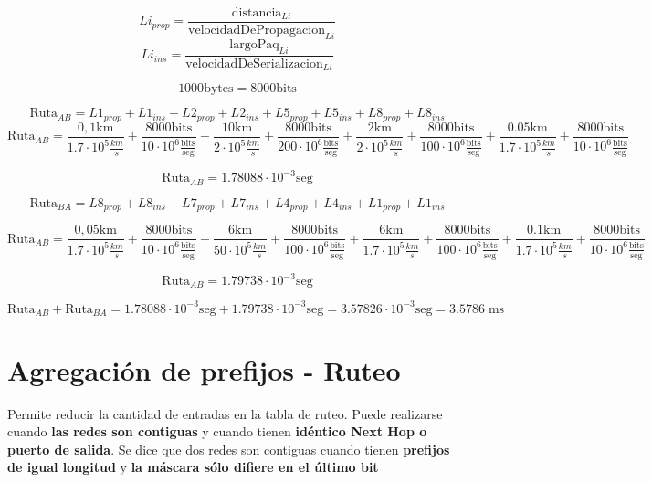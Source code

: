 \documentclass[titlepage,a4paper]{article}
\begin{document}
$$ Li_{prop} = \frac{\mathrm{distancia}_{Li}}{\mathrm{velocidadDePropagacion}_{Li}}$$
$$ Li_{ins} = \frac{\mathrm{largoPaq}_{Li}}{\mathrm{velocidadDeSerializacion}_{Li}}$$

$$1000 \mathrm{bytes} = 8000 \mathrm{bits}$$


$$ \mathrm{Ruta}_{AB} = L1_{prop} + L1_{ins} + L2_{prop} + L2_{ins} + L5_{prop} + L5_{ins} + L8_{prop} + L8_{ins}$$
$$ \mathrm{Ruta}_{AB} = \frac{0,1 \mathrm{km}}{1.7\cdot10^{5}\frac{km}{s}} + \frac{8000 \mathrm{bits}}{10\cdot10^6 \frac{\mathrm{bits}}{\mathrm{seg}}} + \frac{10 \mathrm{km}}{2\cdot10^{5}\frac{km}{s}} + \frac{8000 \mathrm{bits}}{200\cdot10^6 \frac{\mathrm{bits}}{\mathrm{seg}}} + \frac{2 \mathrm{km}}{2\cdot10^{5}\frac{km}{s}} + \frac{8000 \mathrm{bits}}{100\cdot10^6 \frac{\mathrm{bits}}{\mathrm{seg}}}  +\frac{0.05 \mathrm{km}}{1.7\cdot10^{5}\frac{km}{s}} + \frac{8000 \mathrm{bits}}{10\cdot10^6 \frac{\mathrm{bits}}{\mathrm{seg}}}$$

$$ \mathrm{Ruta}_{AB} = 1.78088 \cdot 10^{-3} \mathrm{seg} $$

$$ \mathrm{Ruta}_{BA} = L8_{prop} + L8_{ins} + L7_{prop} + L7_{ins} + L4_{prop} + L4_{ins} + L1_{prop} + L1_{ins}$$

$$ \mathrm{Ruta}_{AB} = \frac{0,05 \mathrm{km}}{1.7\cdot10^{5}\frac{km}{s}} + \frac{8000 \mathrm{bits}}{10\cdot10^6 \frac{\mathrm{bits}}{\mathrm{seg}}} + \frac{6 \mathrm{km}}{50\cdot10^{5}\frac{km}{s}} + \frac{8000 \mathrm{bits}}{100\cdot10^6 \frac{\mathrm{bits}}{\mathrm{seg}}} + \frac{6 \mathrm{km}}{1.7\cdot10^{5}\frac{km}{s}} + \frac{8000 \mathrm{bits}}{100\cdot10^6 \frac{\mathrm{bits}}{\mathrm{seg}}}  +\frac{0.1 \mathrm{km}}{1.7\cdot10^{5}\frac{km}{s}} + \frac{8000 \mathrm{bits}}{10\cdot10^6 \frac{\mathrm{bits}}{\mathrm{seg}}}$$

$$ \mathrm{Ruta}_{AB} = 1.79738 \cdot 10^{-3} \mathrm{seg}$$

$$ \mathrm{Ruta}_{AB} + \mathrm{Ruta}_{BA} = 1.78088 \cdot 10^{-3} \mathrm{seg} + 1.79738 \cdot 10^{-3} \mathrm{seg} = 3.57826 \cdot 10^{-3} \mathrm{seg} = 3.5786 \; \mathrm{ms} $$

\section{Agregación de prefijos - Ruteo}\label{sec:agrprefijos}

Permite reducir la cantidad de entradas en la tabla de ruteo. Puede realizarse cuando \textbf{las redes son contiguas} y cuando tienen \textbf{idéntico Next Hop o puerto de salida}. Se dice que dos redes son contiguas cuando tienen \textbf{prefijos de igual longitud} y \textbf{la máscara sólo difiere en el último bit}
\end{document}

